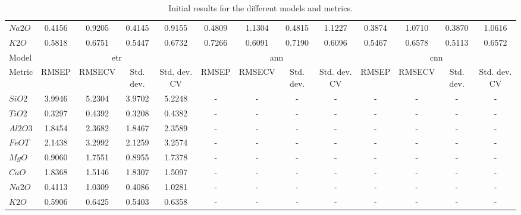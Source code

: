 \begin{table*}[]
{\begin{tabular}{l|cccc|cccc|cccc}
$Na2O$ & 0.4156 & 0.9205 & 0.4145 & 0.9155 & 0.4809 & 1.1304 & 0.4815 & 1.1227 & 0.3874 & 1.0710 & 0.3870 & 1.0616 \\
$K2O$ & 0.5818 & 0.6751 & 0.5447 & 0.6732 & 0.7266 & 0.6091 & 0.7190 & 0.6096 & 0.5467 & 0.6578 & 0.5113 & 0.6572 \\
\hline
Model & \multicolumn{4}{c}{\gls{etr}} & \multicolumn{4}{c}{\gls{ann}} & \multicolumn{4}{c}{\gls{cnn}} \\
Metric & \multicolumn{1}{c}{RMSEP} & \multicolumn{1}{c}{RMSECV} & \multicolumn{1}{c}{Std. dev.} & \multicolumn{1}{c}{Std. dev. CV} & \multicolumn{1}{c}{RMSEP} & \multicolumn{1}{c}{RMSECV} & \multicolumn{1}{c}{Std. dev.} & \multicolumn{1}{c}{Std. dev. CV} & \multicolumn{1}{c}{RMSEP} & \multicolumn{1}{c}{RMSECV} & \multicolumn{1}{c}{Std. dev.} & \multicolumn{1}{c}{Std. dev. CV} \\
\hline
$SiO2$ & 3.9946 & 5.2304 & 3.9702 & 5.2248 & - & - & - & - & - & - & - & - \\
$TiO2$ & 0.3297 & 0.4392 & 0.3208 & 0.4382 & - & - & - & - & - & - & - & - \\
$Al2O3$ & 1.8454 & 2.3682 & 1.8467 & 2.3589 & - & - & - & - & - & - & - & - \\
$FeOT$ & 2.1438 & 3.2992 & 2.1259 & 3.2574 & - & - & - & - & - & - & - & - \\
$MgO$ & 0.9060 & 1.7551 & 0.8955 & 1.7378 & - & - & - & - & - & - & - & - \\
$CaO$ & 1.8368 & 1.5146 & 1.8307 & 1.5097 & - & - & - & - & - & - & - & - \\
$Na2O$ & 0.4113 & 1.0309 & 0.4086 & 1.0281 & - & - & - & - & - & - & - & - \\
$K2O$ & 0.5906 & 0.6425 & 0.5403 & 0.6358 & - & - & - & - & - & - & - & - \\
\hline
\end{tabular}%
}
\caption{Initial results for the different models and metrics.}
\end{table*}
